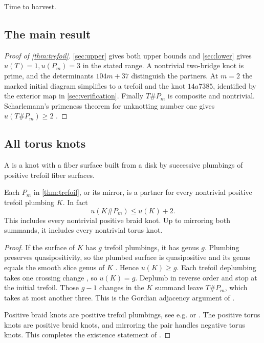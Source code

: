 \documentclass[a4paper,11pt]{amsart}
\let\emph\relax
\numberwithin{equation}{subsection}
\theoremstyle{plain}
\theoremstyle{remark}
\begin{document}
Time to harvest.

\subsection{The main result}

\begin{proof}[Proof of \autoref{thm:trefoil}]
\autoref{sec:upper} gives both upper bounds and \autoref{sec:lower} gives $u(T)=1,u(P_m)=3$ in the stated range. A nontrivial two-bridge knot is prime, and the determinants $104m+37$ distinguish the partners. At $m=2$ the marked initial diagram simplifies to a trefoil and the knot $14a7385$, identified by the exterior map in \autoref{sec:verification}. Finally $T\#P_m$ is composite and nontrivial. Scharlemann's primeness theorem for unknotting number one gives $u(T\#P_m)\geq2$ \cite{Scharlemann}.
\end{proof}

\subsection{All torus knots}

A \emph{positive trefoil plumbing} is a knot with a fiber surface built from a disk by successive plumbings of positive trefoil fiber surfaces.

\begin{Corollary}\label{cor:braids}
Each $P_m$ in \autoref{thm:trefoil}, or its mirror, is a partner for every nontrivial positive trefoil plumbing $K$. In fact
\[
u(K\#P_m)\leq u(K)+2.
\]
This includes every nontrivial positive braid knot. Up to mirroring both summands, it includes every nontrivial torus knot.
\end{Corollary}

\begin{proof}
If the surface of $K$ has $g$ trefoil plumbings, it has genus $g$. Plumbing preserves quasipositivity, so the plumbed surface is quasipositive and its genus equals the smooth slice genus of $K$ \cite[Theorem~4.3 and Lemma~5.2.1]{Rudolph}. Hence $u(K)\geq g$. Each trefoil deplumbing takes one crossing change \cite[Figure~6]{Kegel}, so $u(K)=g$. Deplumb in reverse order and stop at the initial trefoil. Those $g-1$ changes in the $K$ summand leave $T\#P_m$, which takes at most another three. This is the Gordian adjacency argument of \cite[Lemma~4.1]{BH-small}.

Positive braid knots are positive trefoil plumbings, see e.g. \cite{Baader-Dehornoy} or \cite[Section~1]{Kegel}. The positive torus knots are positive braid knots, and mirroring the pair handles negative torus knots. This completes the existence statement of \cite[Corollary~4.2]{BH-small}.
\end{proof}
\end{document}
